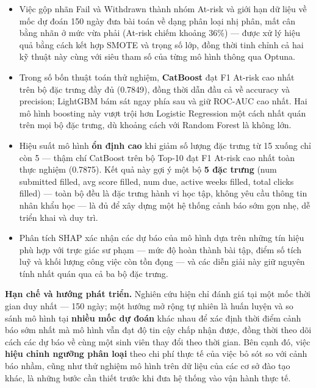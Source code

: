 \documentclass[a4paper]{article}
\newcommand{\code}[1]{{\ttfamily\def\_{\textunderscore\discretionary{}{}{}}#1}}
\def\code#1{#1}%
\def\_{ }%
\begin{document}
\begin{itemize}[leftmargin=*]
  \item Việc gộp nhãn Fail và Withdrawn thành nhóm At-risk và giới hạn dữ liệu
        về mốc dự đoán 150 ngày đưa bài toán về dạng phân loại nhị phân, mất
        cân bằng nhãn ở mức vừa phải (At-risk chiếm khoảng 36\%) --- được
        xử lý hiệu quả bằng cách kết hợp SMOTE và trọng số lớp, đồng thời tinh
        chỉnh cả hai kỹ thuật này cùng với siêu tham số của từng mô hình thông
        qua Optuna.
  \item Trong số bốn thuật toán thử nghiệm, \textbf{CatBoost} đạt F1 At-risk
        cao nhất trên bộ đặc trưng đầy đủ (0.7849), đồng thời dẫn đầu cả về
        accuracy và precision; LightGBM bám sát ngay phía sau và giữ ROC-AUC
        cao nhất. Hai mô hình boosting này vượt trội hơn Logistic Regression
        một cách nhất quán trên mọi bộ đặc trưng, dù khoảng cách với Random
        Forest là không lớn.
  \item Hiệu suất mô hình \textbf{ổn định cao} khi giảm số lượng đặc trưng từ
        15 xuống chỉ còn 5 --- thậm chí CatBoost trên bộ Top-10 đạt F1
        At-risk cao nhất toàn thực nghiệm (0.7875). Kết quả này gợi ý một bộ
        \textbf{5 đặc trưng} (\code{num\_submitted\_filled},
        \code{avg\_score\_filled}, \code{num\_due}, \code{active\_weeks\_filled},
        \code{total\_clicks\_filled}) --- toàn bộ đều là đặc trưng hành vi học
        tập, không yêu cầu thông tin nhân khẩu học --- là đủ để xây dựng một hệ
        thống cảnh báo sớm gọn nhẹ, dễ triển khai và duy trì.
  \item Phân tích SHAP xác nhận các dự báo của mô hình dựa trên những tín hiệu
        phù hợp với trực giác sư phạm --- mức độ hoàn thành bài tập, điểm số
        tích luỹ và khối lượng công việc còn tồn đọng --- và các diễn giải này
        giữ nguyên tính nhất quán qua cả ba bộ đặc trưng.
\end{itemize}

\textbf{Hạn chế và hướng phát triển.} Nghiên cứu hiện chỉ đánh giá tại một mốc
thời gian duy nhất --- 150 ngày; một hướng mở rộng tự nhiên là huấn luyện và so
sánh mô hình tại \textbf{nhiều mốc dự đoán} khác nhau để xác định thời điểm
cảnh báo sớm nhất mà mô hình vẫn đạt độ tin cậy chấp nhận được, đồng thời theo
dõi cách các dự báo về cùng một sinh viên thay đổi theo thời gian. Bên cạnh
đó, việc \textbf{hiệu chỉnh ngưỡng phân loại} theo chi phí thực tế của việc bỏ
sót so với cảnh báo nhầm, cũng như thử nghiệm mô hình trên dữ liệu của các cơ
sở đào tạo khác, là những bước cần thiết trước khi đưa hệ thống vào vận hành
thực tế.
\end{document}

